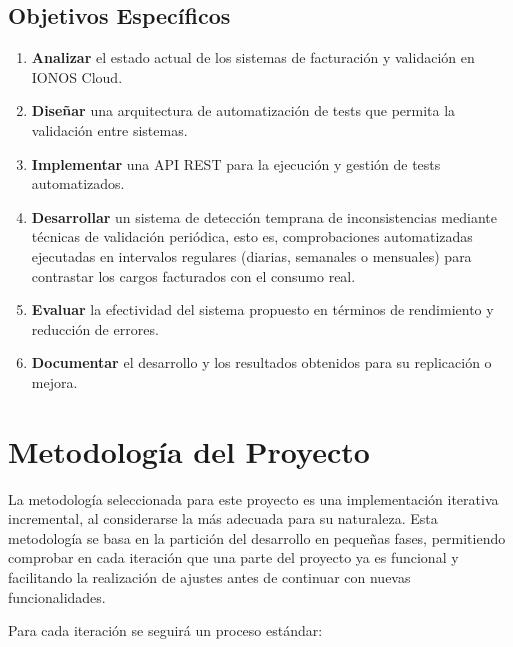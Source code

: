 \subsection{Objetivos Específicos}

\begin{enumerate}
    \item \textbf{Analizar} el estado actual de los sistemas de facturación y validación en IONOS Cloud.

    \item \textbf{Diseñar} una arquitectura de automatización de tests que permita la validación entre sistemas.

    \item \textbf{Implementar} una API REST para la ejecución y gestión de tests automatizados.

    \item \textbf{Desarrollar} un sistema de detección temprana de inconsistencias mediante técnicas de validación periódica, esto es, comprobaciones automatizadas ejecutadas en intervalos regulares (diarias, semanales o mensuales) para contrastar los cargos facturados con el consumo real.

    \item \textbf{Evaluar} la efectividad del sistema propuesto en términos de rendimiento y reducción de errores.

    \item \textbf{Documentar} el desarrollo y los resultados obtenidos para su replicación o mejora.
\end{enumerate}
\section{Metodología del Proyecto}

La metodología seleccionada para este proyecto es una implementación iterativa incremental, al considerarse la más adecuada para su naturaleza. Esta metodología se basa en la partición del desarrollo en pequeñas fases, permitiendo comprobar en cada iteración que una parte del proyecto ya es funcional y facilitando la realización de ajustes antes de continuar con nuevas funcionalidades.

Para cada iteración se seguirá un proceso estándar:


